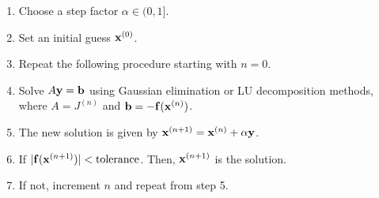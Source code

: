 \begin{myalgobox}
   \label{algo:gaussian_elimination}
   \begin{enumerate}
      \item Choose a step factor $\alpha \in (0, 1]$.
      \item Set an initial guess $\vb{x}^{(0)}$.
      \item Repeat the following procedure starting with $n=0$.
      \item Solve $A \vb{y} = \vb{b}$ using Gaussian elimination or LU decomposition methods, where $A = J^{(n)}$ and $\vb{b}=-\vb{f}(\vb{x}^{(n)})$.
      \item The new solution is given by $\vb{x}^{(n+1)}= \vb{x}^{(n)}+\alpha \vb{y}$.
      \item If $| \vb{f}(\vb{x}^{(n+1)}) | < \text{tolerance}$.  Then, $\vb{x}^{(n+1)}$ is the solution.
      \item If not, increment $n$ and repeat from step 5.
   \end{enumerate}
\end{myalgobox}

